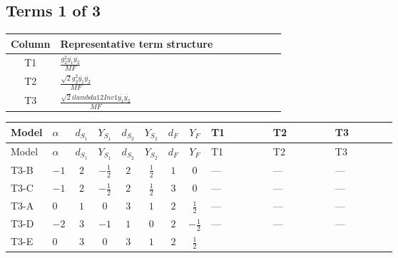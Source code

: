 \documentclass[8pt]{article}
\begin{document}
\begin{landscape}
\subsection*{Terms 1 of 3}
\begin{center}
\begin{tabular}{@{}c >{\raggedright\arraybackslash}p{0.82\linewidth}@{}}
\toprule
Column & Representative term structure \\
\midrule
T1 & \(\displaystyle \frac{g_{2}^{2} \overline{y_{1}} \overline{y_{2}}}{MF}\) \\
\midrule
T2 & \(\displaystyle \frac{\sqrt{2} g_{2}^{2} \overline{y_{1}} \overline{y_{2}}}{MF}\) \\
\midrule
T3 & \(\displaystyle \frac{\sqrt{2} i lambda12Inv1 \overline{y_{1}} \overline{y_{2}}}{MF}\) \\
\midrule
\bottomrule
\end{tabular}
\end{center}
\smallskip
\tiny
\begin{longtable}{@{}llcccccc >{\raggedright\arraybackslash}p{0.21\linewidth} >{\raggedright\arraybackslash}p{0.21\linewidth} >{\raggedright\arraybackslash}p{0.21\linewidth}@{}}
\toprule
Model & $\alpha$ & $d_{S_1}$ & $Y_{S_1}$ & $d_{S_2}$ & $Y_{S_2}$ & $d_F$ & $Y_F$ & T1 & T2 & T3 \\
\midrule
\endfirsthead
\toprule
Model & $\alpha$ & $d_{S_1}$ & $Y_{S_1}$ & $d_{S_2}$ & $Y_{S_2}$ & $d_F$ & $Y_F$ & T1 & T2 & T3 \\
\midrule
\endhead
T3-B & $-1$ & $2$ & $-\frac{1}{2}$ & $2$ & $\frac{1}{2}$ & $1$ & $0$ & --- & --- & --- \\
\midrule
T3-C & $-1$ & $2$ & $-\frac{1}{2}$ & $2$ & $\frac{1}{2}$ & $3$ & $0$ & --- & --- & --- \\
\midrule
T3-A & $0$ & $1$ & $0$ & $3$ & $1$ & $2$ & $\frac{1}{2}$ & --- & --- & --- \\
\midrule
T3-D & $-2$ & $3$ & $-1$ & $1$ & $0$ & $2$ & $-\frac{1}{2}$ & --- & --- & --- \\
\midrule
T3-E & $0$ & $3$ & $0$ & $3$ & $1$ & $2$ & $\frac{1}{2}$ & \scriptsize\adjustbox{max width=\linewidth}{$\begin{gathered} \frac{g_{2}^{2} \overline{y_{1}} \overline{y_{2}}}{MF}\end{gathered}$} & \scriptsize\adjustbox{max width=\linewidth}{$\begin{gathered} \frac{\sqrt{2} g_{2}^{2} \overline{y_{1}} \overline{y_{2}}}{4 MF}\end{gathered}$} & \scriptsize\adjustbox{max width=\linewidth}{$\begin{gathered} - \frac{\sqrt{2} i lambda12Inv1 \overline{y_{1}} \overline{y_{2}}}{4 MF}\end{gathered}$} \\
\midrule
\bottomrule
\end{longtable}
\clearpage

\end{landscape}
\end{document}
